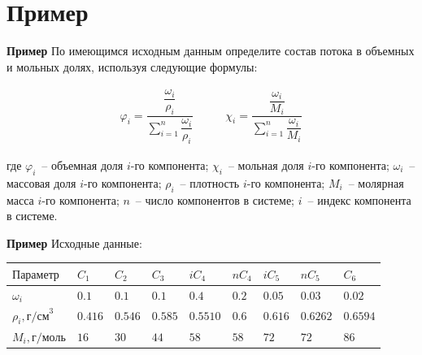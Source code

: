 \documentclass[aspectratio=169, mathserif]{beamer}%
\begin{document}
\section{Пример}
\sectionframe

\begin{frame}[fragile]{\space}
\scriptsize
\begin{alertblock}{\textbf{Пример}}
По имеющимся исходным данным определите состав потока в объемных и мольных долях, используя следующие формулы:
\end{alertblock}
\vfill
\begin{large}
\begin{equation*}
	\begin{aligned}
		\varphi _i = \dfrac{\dfrac{\omega _i}{\rho _i}}{\sum \limits _{i=1}^{n} \dfrac{\omega _i}{\rho _i}} &\qquad \chi _i = \dfrac{\dfrac{\omega _i}{M_i}}{\sum \limits_{i=1}^{n}\dfrac{\omega _i}{M_i}}
	\end{aligned}
\end{equation*}
\end{large}
\vfill
где $\varphi _i$~-- объемная доля $i$-го компонента; $\chi _i$~-- мольная доля $i$-го компонента; $\omega _i$~-- массовая доля $i$-го компонента; $\rho _i$~-- плотность $i$-го компонента; $M_i$~-- молярная масса $i$-го компонента; $n$~-- число компонентов в системе; $i$~-- индекс компонента в системе.
\vfill
\end{frame}

\begin{frame}[fragile]{\space}
\scriptsize
\begin{alertblock}{\textbf{Пример}}
Исходные данные:
\end{alertblock}
\begin{table}[h!]
	\begin{tabular}{|p{.2\linewidth}|p{.05\linewidth}|p{.05\linewidth}|p{.05\linewidth}|p{.05\linewidth}|p{.05\linewidth}|p{.05\linewidth}|p{.05\linewidth}|p{.05\linewidth}|}
		\hline
		$\mathrm{Параметр}$ & $C_1$ & $C_2$ & $C_3$ & $iC_4$ & $nC_4$ & $iC_5$ & $nC_5$ & $C_6$ \\
		\hline
		$\omega _i$ & $0.1$ & $0.1$ & $0.1$ & $0.4$ & $0.2$ & $0.05$ & $0.03$ & $0.02$ \\
		\hline
		$\rho_i, \mathrm{г/см}^3$ & $0.416$ & $0.546$ & $0.585$ & $0.5510$ & $0.6$ & $0.616$ & $0.6262$ & $0.6594$\\
		\hline
		$M_i, \mathrm{г/моль}$ & $16$ & $30$ & $44$ & $58$ & $58$ & $72$ & $72$ & $86$ \\
		\hline
	\end{tabular}
\end{table}
\vfill
\end{frame}
\end{document}
